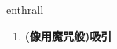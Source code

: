 
\begin{frame}
{\huge enthrall}
\begin{center}
\begin{enumerate}\Large
  \item \textbf{(像用魔咒般)吸引}
\end{enumerate}
\end{center}
\end{frame}
